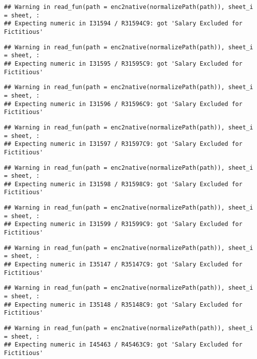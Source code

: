 \documentclass[
]{article}
\begin{document}
\begin{verbatim}
## Warning in read_fun(path = enc2native(normalizePath(path)), sheet_i = sheet, :
## Expecting numeric in I31594 / R31594C9: got 'Salary Excluded for Fictitious'
\end{verbatim}

\begin{verbatim}
## Warning in read_fun(path = enc2native(normalizePath(path)), sheet_i = sheet, :
## Expecting numeric in I31595 / R31595C9: got 'Salary Excluded for Fictitious'
\end{verbatim}

\begin{verbatim}
## Warning in read_fun(path = enc2native(normalizePath(path)), sheet_i = sheet, :
## Expecting numeric in I31596 / R31596C9: got 'Salary Excluded for Fictitious'
\end{verbatim}

\begin{verbatim}
## Warning in read_fun(path = enc2native(normalizePath(path)), sheet_i = sheet, :
## Expecting numeric in I31597 / R31597C9: got 'Salary Excluded for Fictitious'
\end{verbatim}

\begin{verbatim}
## Warning in read_fun(path = enc2native(normalizePath(path)), sheet_i = sheet, :
## Expecting numeric in I31598 / R31598C9: got 'Salary Excluded for Fictitious'
\end{verbatim}

\begin{verbatim}
## Warning in read_fun(path = enc2native(normalizePath(path)), sheet_i = sheet, :
## Expecting numeric in I31599 / R31599C9: got 'Salary Excluded for Fictitious'
\end{verbatim}

\begin{verbatim}
## Warning in read_fun(path = enc2native(normalizePath(path)), sheet_i = sheet, :
## Expecting numeric in I35147 / R35147C9: got 'Salary Excluded for Fictitious'
\end{verbatim}

\begin{verbatim}
## Warning in read_fun(path = enc2native(normalizePath(path)), sheet_i = sheet, :
## Expecting numeric in I35148 / R35148C9: got 'Salary Excluded for Fictitious'
\end{verbatim}

\begin{verbatim}
## Warning in read_fun(path = enc2native(normalizePath(path)), sheet_i = sheet, :
## Expecting numeric in I45463 / R45463C9: got 'Salary Excluded for Fictitious'
\end{verbatim}
\end{document}
